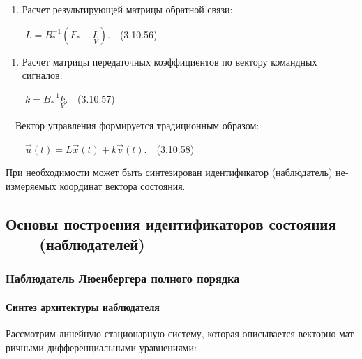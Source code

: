 \documentclass[a4paper]{article}
\newcounter{saveenum}
\newcommand\liststyleWWviiiNumlxxv{%
\renewcommand\theenumi{\arabic{enumi}}
\renewcommand\theenumii{\arabic{enumii}}
\renewcommand\theenumiii{\arabic{enumiii}}
\renewcommand\theenumiv{\arabic{enumiv}}
\renewcommand\labelenumi{\theenumi.}
\renewcommand\labelenumii{\theenumii.}
\renewcommand\labelenumiii{\theenumiii.}
\renewcommand\labelenumiv{\theenumiv.}
}
\begin{document}
\liststyleWWviiiNumlxxv
\setcounter{saveenum}{\value{enumi}}
\begin{enumerate}
\setcounter{enumi}{\value{saveenum}}
\item {\begin{russian}\sffamily
Расчет результирующей матрицы обратной связи:
\end{russian}}
\end{enumerate}
{\begin{russian}\sffamily
\ \ \ \  $L=B_{\ast }^{-1}(F_{\ast }+\underset V{L})$.\ \ (3.10.56)
\end{russian}}

\liststyleWWviiiNumlxxv
\setcounter{saveenum}{\value{enumi}}
\begin{enumerate}
\setcounter{enumi}{\value{saveenum}}
\item {\begin{russian}\sffamily
Расчет матрицы передаточных коэффициентов по вектору командных сигналов:
\end{russian}}
\end{enumerate}
{\begin{russian}\sffamily
\ \ \ \  $k=B_{\ast }^{-1}\underset V{k}$.\ \ (3.10.57)
\end{russian}}

{\begin{russian}\sffamily
\ \ Вектор управления формируется традиционным образом:
\end{russian}}

{\begin{russian}\sffamily
\ \ \ \  $\vec u(t)=L\vec x(t)+k\vec v(t)$.\ \ (3.10.58)
\end{russian}}

{\begin{russian}\sffamily
При необходимости может быть синтезирован идентификатор (наблюдатель) неизмеряемых координат вектора состояния.
\end{russian}}

\clearpage\subsection[Основы построения идентификаторов состояния \ \ \ \ (на­блюдателей)]{Основы построения
идентификаторов состояния \ \ \ \ (на­блюдателей)}
\hypertarget{RefHeadingToc455659749}{}\subsubsection{Наблюдатель Люенбергера полного порядка}
\hypertarget{RefHeadingToc455659750}{}\paragraph{Синтез архитектуры наблюдателя}
{\begin{russian}\sffamily
Рассмотрим линейную стационарную систему, которая описывается векторно-матричными дифференциальными уравнениями:
\end{russian}}
\end{document}
